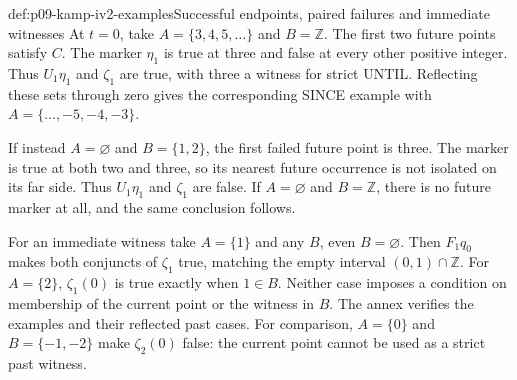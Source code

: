\begin{hbexample}{def:p09-kamp-iv2-examples}{Successful endpoints, paired failures and immediate witnesses}
At \(t=0\), take \(A=\{3,4,5,\ldots\}\) and
\(B=\mathbb Z\). The first two future points satisfy
\(C\). The marker \(\eta_1\) is true at three and
false at every other positive integer. Thus \(U_1\eta_1\)
and \(\zeta_1\) are true, with three a witness for strict
UNTIL. Reflecting these sets through zero gives the corresponding
SINCE example with \(A=\{\ldots,-5,-4,-3\}\).

If instead \(A=\varnothing\) and \(B=\{1,2\}\), the
first failed future point is three. The marker is true at both two
and three, so its nearest future occurrence is not isolated on its
far side. Thus \(U_1\eta_1\) and \(\zeta_1\) are false.
If \(A=\varnothing\) and \(B=\mathbb Z\), there is no
future marker at all, and the same conclusion follows.

For an immediate witness take \(A=\{1\}\) and any \(B\),
even \(B=\varnothing\). Then \(F_1q_0\) makes both
conjuncts of \(\zeta_1\) true, matching the empty interval
\((0,1)\cap\mathbb Z\). For \(A=\{2\}\),
\(\zeta_1(0)\) is true exactly when \(1\in B\).
Neither case imposes a condition on membership of the current point
or the witness in \(B\). The annex verifies the examples and
their reflected past cases.
For comparison, \(A=\{0\}\) and \(B=\{-1,-2\}\)
make \(\zeta_2(0)\) false: the current point cannot be
used as a strict past witness.
\end{hbexample}
